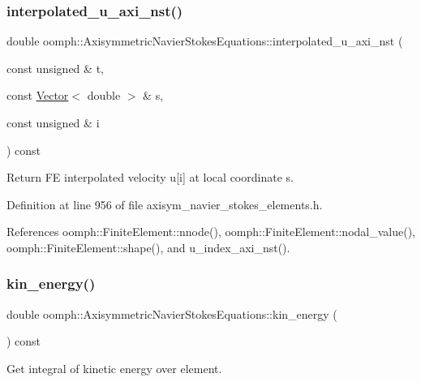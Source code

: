 \subsubsection{\texorpdfstring{interpolated\+\_\+u\+\_\+axi\+\_\+nst()}{interpolated\_u\_axi\_nst()}\hspace{0.1cm}{\footnotesize\ttfamily [3/3]}}
{\footnotesize\ttfamily double oomph\+::\+Axisymmetric\+Navier\+Stokes\+Equations\+::interpolated\+\_\+u\+\_\+axi\+\_\+nst (\begin{DoxyParamCaption}\item[{const unsigned \&}]{t,  }\item[{const \hyperlink{classoomph_1_1Vector}{Vector}$<$ double $>$ \&}]{s,  }\item[{const unsigned \&}]{i }\end{DoxyParamCaption}) const\hspace{0.3cm}{\ttfamily [inline]}}



Return FE interpolated velocity u\mbox{[}i\mbox{]} at local coordinate s. 



Definition at line 956 of file axisym\+\_\+navier\+\_\+stokes\+\_\+elements.\+h.



References oomph\+::\+Finite\+Element\+::nnode(), oomph\+::\+Finite\+Element\+::nodal\+\_\+value(), oomph\+::\+Finite\+Element\+::shape(), and u\+\_\+index\+\_\+axi\+\_\+nst().

\mbox{\label{classoomph_1_1AxisymmetricNavierStokesEquations_a823b3494f75b435cf8d0fbe5572937a8}} 
\subsubsection{\texorpdfstring{kin\+\_\+energy()}{kin\_energy()}}
{\footnotesize\ttfamily double oomph\+::\+Axisymmetric\+Navier\+Stokes\+Equations\+::kin\+\_\+energy (\begin{DoxyParamCaption}{ }\end{DoxyParamCaption}) const}



Get integral of kinetic energy over element. 


